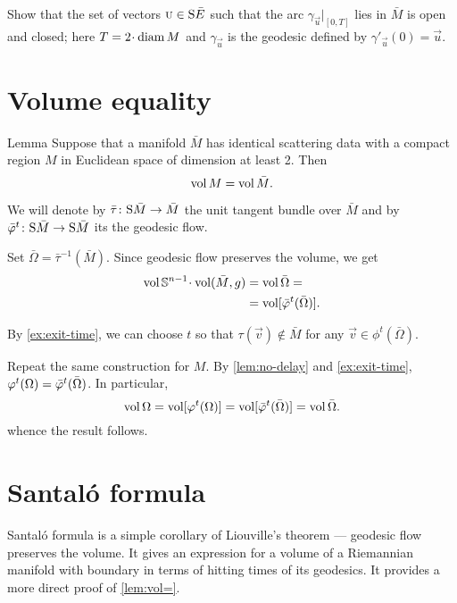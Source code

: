  Show that the set of vectors $\vec u\in\S \bar E$ such that the arc $\gamma_{\vec u}|_{[0, T]}$ lies in $\bar M$ is open and closed;
here $T=2\cdot\diam M$ and $\gamma_{\vec u}$ is the geodesic defined by $\gamma'_{\vec u}(0)=\vec u$.

\section{Volume equality}

\begin{thm}{Lemma}\label{lem:vol=}
Suppose that a manifold $\bar M$ has identical scattering data with a compact region $M$ in Euclidean space of dimension at least 2.
Then 
\[\vol M=\vol \bar M.\]

\end{thm}

We will denote by $\bar \tau\:\S \bar M\to \bar M$ the unit tangent bundle over $\bar M$
and by $\bar\phi^t\:\S \bar M\to \S \bar M$ its the geodesic flow.

Set $\bar\Omega=\bar \tau^{-1}(\bar M)$.
Since geodesic flow preserves the volume, we get 
\begin{align*}
\vol\SSS^{n-1}\cdot\vol(\bar M,g)&=\vol\bar\Omega=
\\
&=\vol[\bar\phi^t(\bar\Omega)].
\end{align*}

By \ref{ex:exit-time}, we can choose $t$ so that $\tau(\vec v)\notin \bar M$ for any $\vec v\in \phi^t(\bar\Omega)$.

Repeat the same construction for $M$. 
By \ref{lem:no-delay} and \ref{ex:exit-time}, $\phi^t(\Omega)\z=\bar\phi^t(\bar\Omega)$.
In particular, 
\[
\vol\Omega=
\vol[\phi^t(\Omega)]=
\vol[\bar\phi^t(\bar\Omega)]=
\vol\bar\Omega.
\]
whence the result follows.
\qeds

\section{Santal\'{o} formula}

Santal\'{o} formula is a simple corollary of Liouville's theorem --- geodesic flow preserves the volume.
It gives an expression for a volume of a Riemannian manifold with boundary in terms of hitting times of its geodesics.
It provides a more direct proof of \ref{lem:vol=}.

